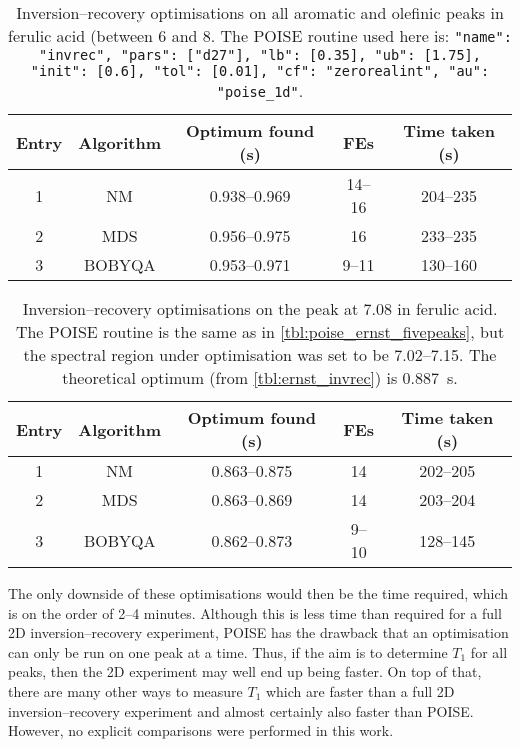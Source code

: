 \begin{table}[htb]
    \centering
    \begin{tabular}{ccccc}
        \toprule
        Entry & Algorithm & Optimum found (\unit{\s}) & FEs    & Time taken (\unit{\s}) \\
        \midrule
        1     & NM        & 0.938--0.969            & 14--16 & 204--235             \\
        2     & MDS       & 0.956--0.975            & 16     & 233--235             \\
        3     & BOBYQA    & 0.953--0.971            & 9--11  & 130--160             \\
        \bottomrule
    \end{tabular}
    \caption[Inversion--recovery optimisations on a range of peaks]{
        Inversion--recovery optimisations on all aromatic and olefinic peaks in ferulic acid (between 6 and \qty{8}{\ppm}.
        The POISE routine used here is: \texttt{{"name": "invrec", "pars": ["d27"], "lb": [0.35], "ub": [1.75], "init": [0.6], "tol": [0.01], "cf": "zerorealint", "au": "poise_1d"}}.
    }
    \label{tbl:invrec_fivepeaks}
\end{table}

\begin{table}[htb]
    \centering
    \begin{tabular}{ccccc}
        \toprule
        Entry & Algorithm & Optimum found (\unit{\s}) & FEs   & Time taken (\unit{\s}) \\
        \midrule
        1     & NM        & 0.863--0.875            & 14    & 202--205             \\
        2     & MDS       & 0.863--0.869            & 14    & 203--204             \\
        3     & BOBYQA    & 0.862--0.873            & 9--10 & 128--145             \\
        \bottomrule
    \end{tabular}
    \caption[Inversion--recovery optimisations on only one peak]{
        Inversion--recovery optimisations on the peak at \qty{7.08}{\ppm} in ferulic acid.
        The POISE routine is the same as in \cref{tbl:poise_ernst_fivepeaks}, but the spectral region under optimisation was set to be 7.02--\qty{7.15}{\ppm}.
        The theoretical optimum (from \cref{tbl:ernst_invrec}) is \qty{0.887}{\s}.
    }
    \label{tbl:invrec_onepeak}
\end{table}

The only downside of these optimisations would then be the time required, which is on the order of 2--4 minutes.
Although this is less time than required for a full 2D inversion--recovery experiment, POISE has the drawback that an optimisation can only be run on one peak at a time.
Thus, if the aim is to determine $T_1$ for all peaks, then the 2D experiment may well end up being faster.
On top of that, there are many other ways to measure $T_1$ which are faster than a full 2D inversion--recovery experiment and almost certainly also faster than POISE.\autocite{Christensen1974JPC,Homer1985JMR,Loening2003JMR,Smith2013CPC,Wei2021JOC}
However, no explicit comparisons were performed in this work.
